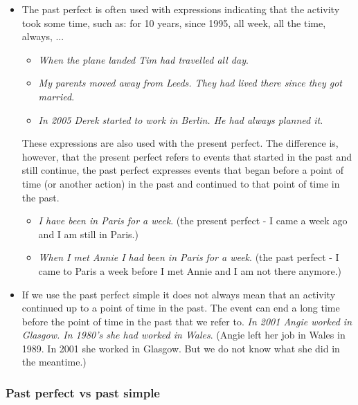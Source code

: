 \begin{itemize}

\item The past perfect is often used with expressions indicating that the activity took some time, such as: for 10 years, since 1995, all week, all the time, always, ... 

\begin{itemize}
\item \textit{When the plane landed Tim had travelled all day}.
\item \textit{My parents moved away from Leeds. They had lived there since they got married}.
\item \textit{In 2005 Derek started to work in Berlin. He had always planned it}.
\end{itemize}

These expressions are also used with the present perfect. The difference is, however, that the present perfect refers to events that started in the past and still continue, the past perfect expresses events that began before a point of time (or another action) in the past and continued to that point of time in the past.

\begin{itemize}
\item \textit{I have been in Paris for a week}. (the present perfect - I came a week ago and I am still in Paris.)
\item \textit{When I met Annie I had been in Paris for a week}. (the past perfect - I came to Paris a week before I met Annie and I am not there anymore.) 
\end{itemize}

\item If we use the past perfect simple it does not always mean that an activity continued up to a point of time in the past. The event can end a long time before the point of time in the past that we refer to. \textit{In 2001 Angie worked in Glasgow. In 1980's she had worked in Wales}. (Angie left her job in Wales in 1989. In 2001 she worked in Glasgow. But we do not know what she did in the meantime.)

\end{itemize}

\subsubsection{Past perfect vs past simple}

